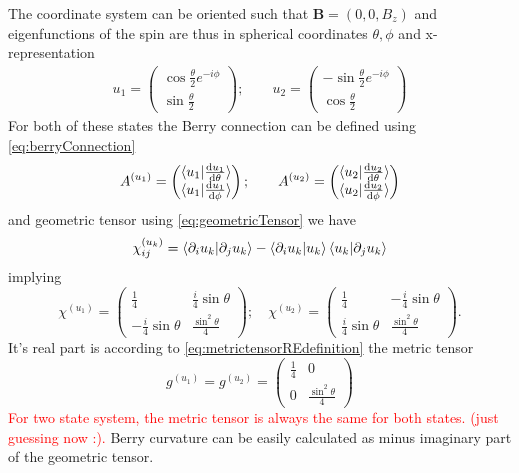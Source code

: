 The coordinate system can be oriented such that $\mathbf B=(0,0,B_z)$ and eigenfunctions of the spin are thus in spherical coordinates $\theta,\phi$ and x-representation
\begin{align}
    u_1=\begin{pmatrix}
        \cos\frac{\theta}{2}e^{-i\phi}\\
        \sin\frac{\theta}{2}
    \end{pmatrix};\qquad
    u_2=\begin{pmatrix}
        -\sin\frac{\theta}{2}e^{-i\phi}\\
        \cos\frac{\theta}{2}
    \end{pmatrix}
\end{align}
For both of these states the Berry connection can be defined using \ref{eq:berryConnection}
\begin{equation}
   A^{(u_1)} = \begin{pmatrix}
    \braket{u_1| \frac{\mathrm{d} u_1}{\mathrm{d} \theta}}\\
    \braket{u_1| \frac{\mathrm{d} u_1}{\mathrm{d} \phi}}
   \end{pmatrix};\qquad 
   A^{(u_2)} = \begin{pmatrix}
    \braket{u_2| \frac{\mathrm{d} u_2}{\mathrm{d} \theta}}\\
    \braket{u_2| \frac{\mathrm{d} u_2}{\mathrm{d} \phi}}
   \end{pmatrix}
\end{equation}
and geometric tensor using \ref{eq:geometricTensor} we have
\begin{equation}
    \chi^{(u_k)}_{ij} = 
        \braket{\partial_i u_k|\partial_j u_k}-\braket{\partial_i u_k| u_k}\braket{u_k|\partial_j u_k} 
\end{equation}
implying
\begin{equation}
    \chi^{(u_1)} = \begin{pmatrix}
        \frac{1}{4}& \frac{i}{4}\sin\theta\\
        -\frac{i}{4}\sin\theta&\frac{\sin^2\theta}{4}
    \end{pmatrix};\quad 
    \chi^{(u_2)} = \begin{pmatrix}
        \frac{1}{4}& -\frac{i}{4}\sin\theta\\
        \frac{i}{4}\sin\theta&\frac{\sin^2\theta}{4}
    \end{pmatrix}.
\end{equation}
It's real part is according to \ref{eq:metrictensorREdefinition} the metric tensor
\begin{equation}
    g^{(u_1)} = g^{(u_2)} =\begin{pmatrix}
        \frac{1}{4}& 0\\
        0&\frac{\sin^2\theta}{4}
    \end{pmatrix}
\end{equation}
\textcolor{red}{For two state system, the metric tensor is always the same for both states. (just guessing now :).} Berry curvature can be easily calculated as minus imaginary part of the geometric tensor. 

